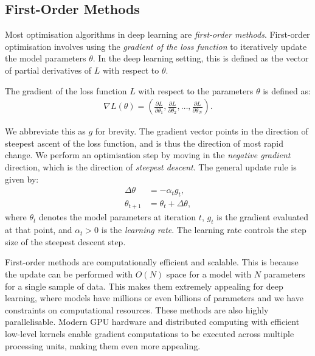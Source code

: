 \subsection{First-Order Methods}
\label{ssec:first_order_methods}

Most optimisation algorithms in deep learning are \textit{first-order methods}. First-order optimisation involves using the \textit{gradient of the loss function} to iteratively update the model parameters $\theta$. In the deep learning setting, this is defined as the vector of partial derivatives of $L$ with respect to $\theta$.
\begin{definition}
    The gradient of the loss function $L$ with respect to the parameters $\theta$ is defined as:
    \begin{align}
        \nabla L(\theta) = \left(\frac{\partial L}{\partial \theta_1}, \frac{\partial L}{\partial \theta_2}, \ldots, \frac{\partial L}{\partial \theta_N}\right).
    \end{align}
\end{definition}

We abbreviate this as $g$ for brevity. The gradient vector points in the direction of steepest ascent of the loss function, and is thus the direction of most rapid change. We perform an optimisation step by moving in the \textit{negative gradient} direction, which is the direction of \textit{steepest descent}. The general update rule is given by:
\begin{align}
    \Delta \theta &= - \alpha_t g_t, \\
    \theta_{t+1} &= \theta_t + \Delta \theta,
    \label{equation:first_order_update}
\end{align}
where $\theta_t$ denotes the model parameters at iteration $t$, $g_t$ is the gradient evaluated at that point, and $\alpha_t > 0$ is the \textit{learning rate}. The learning rate controls the step size of the steepest descent step.

First-order methods are computationally efficient and scalable. This is because the update can be performed with $O(N)$ space for a model with $N$ parameters for a single sample of data. This makes them extremely appealing for deep learning, where models have millions or even billions of parameters and we have constraints on computational resources. These methods are also highly parallelisable. Modern GPU hardware and distributed computing with efficient low-level kernels enable gradient computations to be executed across multiple processing units, making them even more appealing.


